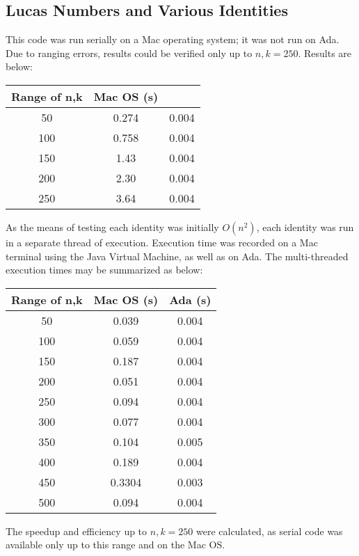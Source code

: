 \documentclass[11pt]{article}
\begin{document}
\subsection{Lucas Numbers and Various Identities}
This code was run serially on a Mac operating system; it was not run on Ada. Due to ranging errors, results could be verified only up to $n,k=250$. Results are below:
\begin{tabular}{ccc}
\hline
 Range of n,k & Mac OS (s)  \\ \hline
50 & 0.274 & 0.004\\
100 & 0.758 & 0.004 \\
150 & 1.43 & 0.004 \\
200 & 2.30 & 0.004 \\
250 & 3.64 & 0.004 \\ 
\hline \hline
\end{tabular}
As the means of testing each identity was initially $O(n^{2})$, each identity was run in a separate thread of execution. Execution time was recorded on a Mac terminal using the Java Virtual Machine, as well as on Ada. The multi-threaded execution times may be summarized as below:\\
\begin{tabular}{ccc}
\hline
 Range of n,k & Mac OS (s) & Ada (s) \\ \hline
50 & 0.039 & 0.004\\
100 & 0.059 & 0.004 \\
150 & 0.187 & 0.004 \\
200 & 0.051 & 0.004 \\
250 & 0.094 & 0.004 \\ 
300 & 0.077 & 0.004 \\
350 & 0.104 & 0.005 \\
400 & 0.189 & 0.004 \\
450 & 0.3304 & 0.003 \\
500 & 0.094 &0.004 \\ \hline \hline
\end{tabular}

The speedup and efficiency up to $n,k=250$ were calculated, as serial code was available only up to this range and on the Mac OS.
\end{document}
